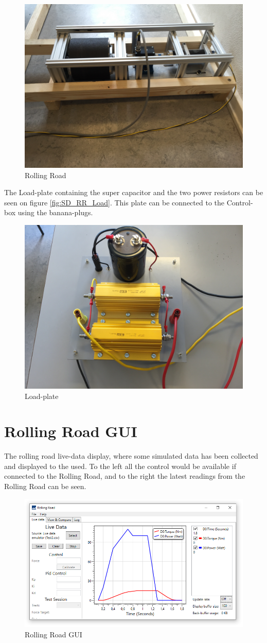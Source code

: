 \begin{figure}[H]
	\centering
	\includegraphics[width=0.7\linewidth]{SubPages/Images/SS_RR_Roal}
	\caption{Rolling Road}
	\label{fig:SS_RR_Roal}
\end{figure}

The Load-plate containing the super capacitor and the two power resistors can be seen on figure \vref{fig:SD_RR_Load}. This plate can be connected to the Control-box using the banana-plugs.

\begin{figure}[H]
	\centering
	\includegraphics[width=0.7\linewidth]{SubPages/Images/SD_RR_Load}
	\caption{Load-plate}
	\label{fig:SD_RR_Load}
\end{figure}

\newpage
\section{Rolling Road GUI}
The rolling road live-data display, where some simulated data has been collected and displayed to the used. To the left all the control would be available if connected to the Rolling Road, and to the right the latest readings from the Rolling Road can be seen.

\begin{figure}[H]
	\centering
	\includegraphics[width=0.9\linewidth]{SubPages/Images/SD_GUI}
	\caption{Rolling Road GUI}
	\label{fig:SD_GUI}
\end{figure}
